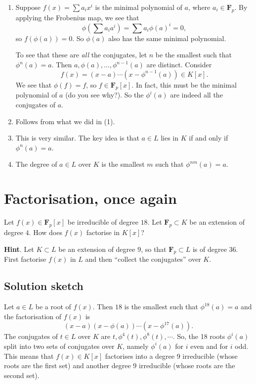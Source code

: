 \documentclass[12pt]{amsart}
\begin{document}
\begin{enumerate}
\item Suppose \(f(x) = \sum a_i x^i\) is the minimal polynomial of \(a\), where \(a_i \in \mathbf{F}_p\).
By applying the Frobenius map, we see that
\[ \phi(\sum a_i a^i) = \sum a_{i} \phi(a)^i = 0,\]
so \(f(\phi(a)) = 0\).
So \(\phi(a)\) also has the same minimal polynomial.

To see that these are \emph{all} the conjugates, let \(n\) be the smallest such that \(\phi^n(a) = a\).
Then \(a, \phi(a), \dots, \phi^{n-1}(a)\) are distinct.
Consider
\[ f(x) = (x-a) \cdots (x-\phi^{n-1}(a)) \in K[x].\]
We see that \(\phi(f) = f\), so \(f \in \mathbf{F}_p[x]\).
In fact, this must be the minimal polynomial of \(a\) (do you see why?).
So the \(\phi^{i}(a)\) are indeed all the conjugates of \(a\).

\item Follows from what we did in (1).

\item This is very similar.  The key idea is that \(a \in L\) lies in \(K\) if and only if \(\phi^n(a) = a\).

\item The degree of \(a \in L\) over \(K\) is the smallest \(m\) such that \(\phi^{nm}(a) = a\).
\end{enumerate}
\section{Factorisation, once again}
\label{sec:org5395a0c}

Let \(f(x) \in \mathbf{F}_p[x]\) be irreducible of degree \(18\).
Let \(\mathbf{F}_p \subset K\) be an extension of degree \(4\).
How does \(f(x)\) factorise in \(K[x]\)?

\noindent
\textbf{Hint}.  Let \(K \subset L\) be an extension of degree 9, so that \(\mathbf{F}_p \subset L\) is of degree 36.  First factorise \(f(x)\) in \(L\) and then ``collect the conjugates'' over \(K\).
\subsection{Solution sketch}
\label{sec:orgc08e820}

Let \(a \in L\) be a root of \(f(x)\).
Then \(18\) is the smallest such that \(\phi^{18}(a) = a\) and the factorisation of \(f(x)\) is
\[ (x-a)(x-\phi(a))\cdots(x-\phi^{17}(a)).\]
The conjugates of \(t \in L\) over \(K\) are \(t, \phi^{4}(t), \phi^{8}(t), \cdots\).
So, the 18 roots \(\phi^i(a)\) split into two sets of conjugates over \(K\), namely \(\phi^i(a)\) for \(i\) even and for \(i\) odd.
This means that \(f(x) \in K[x]\) factorises into a degree 9 irreducible (whose roots are the first set) and another degree 9 irreducible (whose roots are the second set).
\end{document}
